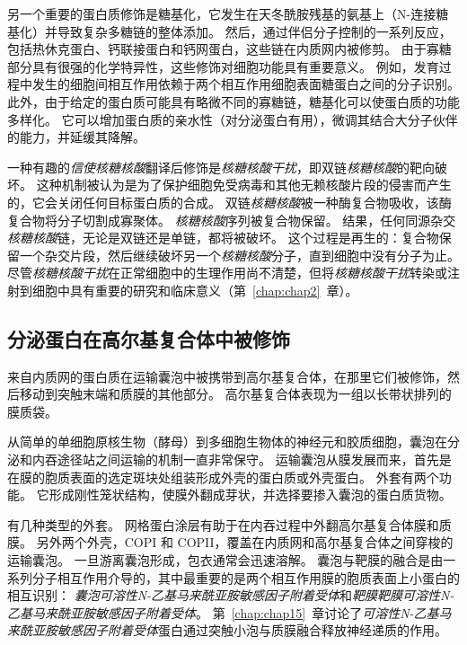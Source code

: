 另一个重要的蛋白质修饰是糖基化，它发生在天冬酰胺残基的氨基上（N-连接糖基化）并导致复杂多糖链的整体添加。
然后，通过伴侣分子控制的一系列反应，包括热休克蛋白、钙联接蛋白和钙网蛋白，这些链在内质网内被修剪。 
由于寡糖部分具有很强的化学特异性，这些修饰对细胞功能具有重要意义。
例如，发育过程中发生的细胞间相互作用依赖于两个相互作用细胞表面糖蛋白之间的分子识别。
此外，由于给定的蛋白质可能具有略微不同的寡糖链，糖基化可以使蛋白质的功能多样化。
它可以增加蛋白质的亲水性（对分泌蛋白有用），微调其结合大分子伙伴的能力，并延缓其降解。


一种有趣的\textit{信使核糖核酸}翻译后修饰是\textit{核糖核酸干扰}，即双链\textit{核糖核酸}的靶向破坏。
这种机制被认为是为了保护细胞免受病毒和其他无赖核酸片段的侵害而产生的，它会关闭任何目标蛋白质的合成。 
双链\textit{核糖核酸}被一种酶复合物吸收，该酶复合物将分子切割成寡聚体。
\textit{核糖核酸}序列被复合物保留。
结果，任何同源杂交\textit{核糖核酸}链，无论是双链还是单链，都将被破坏。
这个过程是再生的：复合物保留一个杂交片段，然后继续破坏另一个\textit{核糖核酸}分子，直到细胞中没有分子为止。
尽管\textit{核糖核酸干扰}在正常细胞中的生理作用尚不清楚，但将\textit{核糖核酸干扰}转染或注射到细胞中具有重要的研究和临床意义（第~\ref{chap:chap2}~章）。



\subsection{分泌蛋白在高尔基复合体中被修饰}

来自内质网的蛋白质在运输囊泡中被携带到高尔基复合体，在那里它们被修饰，然后移动到突触末端和质膜的其他部分。
高尔基复合体表现为一组以长带状排列的膜质袋。


从简单的单细胞原核生物（酵母）到多细胞生物体的神经元和胶质细胞，囊泡在分泌和内吞途径站之间运输的机制一直非常保守。
运输囊泡从膜发展而来，首先是在膜的胞质表面的选定斑块处组装形成外壳的蛋白质或外壳蛋白。
外套有两个功能。
它形成刚性笼状结构，使膜外翻成芽状，并选择要掺入囊泡的蛋白质货物。


有几种类型的外套。
网格蛋白涂层有助于在内吞过程中外翻高尔基复合体膜和质膜。
另外两个外壳，COPI 和 COPII，覆盖在内质网和高尔基复合体之间穿梭的运输囊泡。
一旦游离囊泡形成，包衣通常会迅速溶解。
囊泡与靶膜的融合是由一系列分子相互作用介导的，其中最重要的是两个相互作用膜的胞质表面上小蛋白的相互识别：
\textit{囊泡可溶性N-乙基马来酰亚胺敏感因子附着受体}和\textit{靶膜靶膜可溶性N-乙基马来酰亚胺敏感因子附着受体}。
第~\ref{chap:chap15}~章讨论了\textit{可溶性N-乙基马来酰亚胺敏感因子附着受体}蛋白通过突触小泡与质膜融合释放神经递质的作用。


